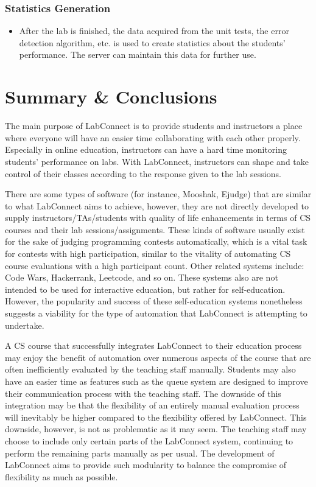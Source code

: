 \documentclass[a4paper, 12pt]{article}
\begin{document}
    \subsubsection{Statistics Generation}

    \begin{itemize}
      \item After the lab is finished, the data acquired from the unit tests, the error detection algorithm, etc. is used
      to create statistics about the students' performance. The server can maintain this data for further use.
    \end{itemize}

    \section{Summary \& Conclusions}

    The main purpose of LabConnect is to provide students and instructors a place where everyone will have an easier time
    collaborating with each other properly. Especially in online education, instructors can have a hard time monitoring students'
    performance on labs. With LabConnect, instructors can shape and take control of their classes according to the response given to the lab sessions.
    
    There are some types of software (for instance, Mooshak, Ejudge) that are similar to what LabConnect aims to achieve, however, they are not directly 
    developed to supply instructors/TAs/students with quality of life enhancements in terms of CS courses and their lab sessions/assignments. 
    These kinds of software usually exist for the sake of judging programming contests automatically, which is a vital task for contests
    with high participation, similar to the vitality of automating CS course evaluations with a high participant count. 
    Other related systems include: Code Wars, Hackerrank, Leetcode, and so on.
    These systems also are not intended to be used for interactive education, but rather for self-education.
    However, the popularity and success of these self-education systems nonetheless suggests a viability for the type of 
    automation that LabConnect is attempting to undertake.
    
    A CS course that successfully integrates LabConnect to their education process may enjoy the benefit of automation over
    numerous aspects of the course that are often inefficiently evaluated by the teaching staff manually. Students may also have an easier time
    as features such as the queue system are designed to improve their communication process with the teaching staff. 
    The downside of this integration may be that the flexibility of an entirely manual evaluation process will inevitably be higher compared to
    the flexibility offered by LabConnect. This downside, however, is not as problematic as it may seem. The teaching staff may choose to
    include only certain parts of the LabConnect system, continuing to perform the remaining parts manually as per usual.
    The development of LabConnect aims to provide such modularity to balance the compromise of flexibility as much as possible.

    \pagebreak

    \printbibliography
\end{document}
